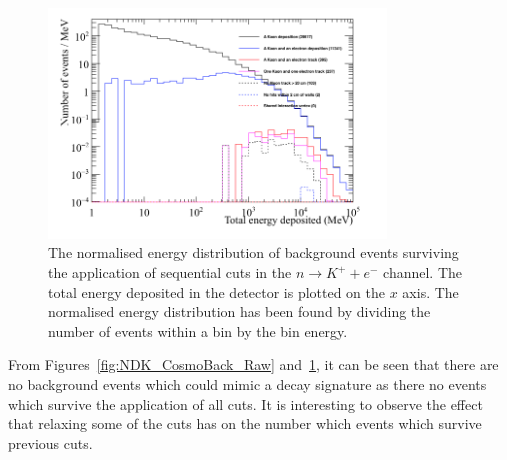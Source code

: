 \begin{figure}[h!]
  \centering
  \includegraphics[width=0.8\textwidth]{CosmicBackground_EnergyDepCuts_Norm}
  \caption[The normalised energy distribution of background events surviving the application of sequential cuts in the $n \rightarrow K^{+} + e^{-}$ channel]
          {The normalised energy distribution of background events surviving the application of sequential cuts in the $n \rightarrow K^{+} + e^{-}$ channel. The total energy deposited in the detector is plotted on the $x$ axis. The normalised energy distribution has been found by dividing the number of events within a bin by the bin energy.}
  \label{fig:NDK_CosmoBack_Norm}
\end{figure}

From Figures~\ref{fig:NDK_CosmoBack_Raw} and~\ref{fig:NDK_CosmoBack_Norm}, it can be seen that there are no background events which could mimic a decay signature as there no events which survive the application of all cuts. It is interesting to observe the effect that relaxing some of the cuts has on the number which events which survive previous cuts. 

